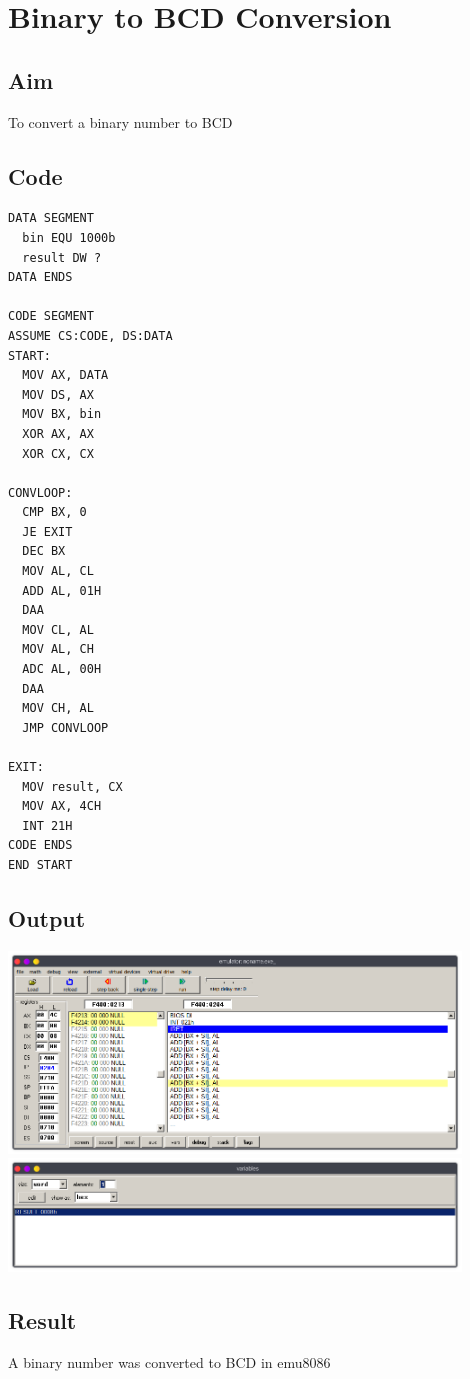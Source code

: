 \section{Binary to BCD Conversion}
\subsection{Aim}
To convert a binary number to BCD

\subsection{Code}
\begin{lstlisting}
DATA SEGMENT
  bin EQU 1000b
  result DW ?
DATA ENDS

CODE SEGMENT
ASSUME CS:CODE, DS:DATA
START:
  MOV AX, DATA
  MOV DS, AX
  MOV BX, bin
  XOR AX, AX
  XOR CX, CX

CONVLOOP:
  CMP BX, 0
  JE EXIT
  DEC BX
  MOV AL, CL
  ADD AL, 01H
  DAA
  MOV CL, AL
  MOV AL, CH
  ADC AL, 00H
  DAA
  MOV CH, AL
  JMP CONVLOOP

EXIT:
  MOV result, CX
  MOV AX, 4CH
  INT 21H
CODE ENDS
END START
\end{lstlisting}

\subsection{Output}
\begin{center}
	\includegraphics[width=0.90\textwidth]{img/p12/ss1.png}
	\includegraphics[width=0.90\textwidth]{img/p12/ss2.png}
\end{center}

\subsection{Result}
A binary number was converted to BCD in emu8086